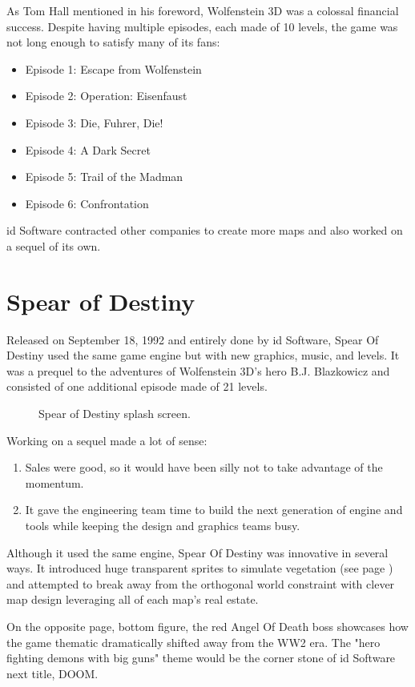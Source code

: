 \documentclass[book.tex]{subfiles}
\begin{document}
As Tom Hall mentioned in his foreword, Wolfenstein 3D was a colossal financial success. Despite having multiple episodes, each made of 10 levels, the game was not long enough to satisfy many of its fans:\\
\begin{itemize}
\item Episode 1: Escape from Wolfenstein
\item Episode 2: Operation: Eisenfaust
\item Episode 3: Die, Fuhrer, Die!
\item Episode 4: A Dark Secret
\item Episode 5: Trail of the Madman
\item Episode 6: Confrontation
\end{itemize}
id Software contracted other companies to create more maps and also worked on a sequel of its own.

\section{Spear of Destiny}
Released on September 18, 1992 and entirely done by id Software, Spear Of Destiny used the same game engine but with new graphics, music, and levels. It was a prequel to the adventures of Wolfenstein 3D's hero B.J. Blazkowicz and consisted of one additional episode made of 21 levels.\\
   \par
\begin{figure}[H]
\centering
 \caption{Spear of Destiny splash screen.}
 \end{figure}
 \par
 Working on a sequel made a lot of sense:
 \begin{enumerate}
 \item Sales were good, so it would have been silly not to take advantage of the momentum.
 \item It gave the engineering team time to build the next generation of engine and tools while keeping the design and graphics teams busy.
 \end{enumerate}
Although it used the same engine, Spear Of Destiny was innovative in several ways. It introduced huge transparent sprites to simulate vegetation (see page \pageref{spears_of_destiny_play}) and attempted to break away from the orthogonal world constraint with clever map design leveraging all of each map's real estate.\\
    \par
On the opposite page, bottom figure, the red Angel Of Death boss showcases how the game thematic dramatically shifted away from the WW2 era. The "hero fighting demons with big guns" theme would be the corner stone of id Software next title, DOOM. 
\begin{figure}[H]
\centering
 \end{figure}
 \par
 \label{spears_of_destiny_play}
 \begin{figure}[H]
\centering
 \end{figure}
\end{document}
